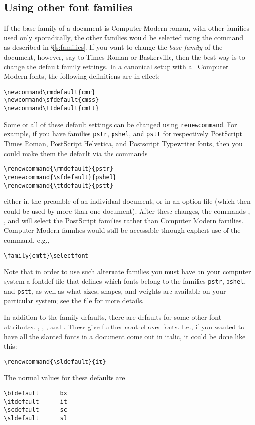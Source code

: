 \subsection{Using other font families}
If the base family of a document is Computer Modern roman, with other
families used only sporadically, the other families would be
selected using the  command as described in
\S\ref{s:families}.  If you want to change the {\it base family\/}
of the document, however, say to Times Roman or Baskerville,
then the best way is to change the default family settings.
In a canonical setup with all Computer Modern fonts, the following
definitions are in effect:
\begin{verbatim}
\newcommand\rmdefault{cmr}
\newcommand\sfdefault{cmss}
\newcommand\ttdefault{cmtt}
\end{verbatim}
Some or all of these default settings can be changed using
{\tt\bslash renewcommand}.  For example, if you have families
{\tt pstr}, {\tt pshel}, and {\tt pstt} for respectively
PostScript Times Roman, PostScript Helvetica, and Postscript
Typewriter fonts, then you could make them the default
via the commands
\begin{verbatim}
\renewcommand{\rmdefault}{pstr}
\renewcommand{\sfdefault}{pshel}
\renewcommand{\ttdefault}{pstt}
\end{verbatim}
either in the preamble of an individual document, or in an
option file (which then could be used by more than one document).
After these changes, the commands , , and 
will select the PostScript families rather than Computer Modern families.
Computer Modern families would still be accessible through explicit
use of the  command, e.g., 
\begin{verbatim}
\family{cmtt}\selectfont
\end{verbatim}

Note that in order to
use such alternate families you must
have on your computer system
a fontdef file that defines which fonts belong to the
families {\tt pstr}, {\tt pshel}, and {\tt pstt},
as well as what sizes, shapes, and weights
are available on your particular system;
see the file  for more details.

In addition to the family defaults, there are defaults for some other
font attributes: , , , and
. These give further control over fonts. I.e., if you
wanted to have all the slanted fonts in a document come out in italic,
it could be done like this: 
\begin{verbatim}
\renewcommand{\sldefault}{it}
\end{verbatim}
The normal values for these defaults are 
\begin{verbatim}
\bfdefault      bx
\itdefault      it
\scdefault      sc
\sldefault      sl
\end{verbatim}

